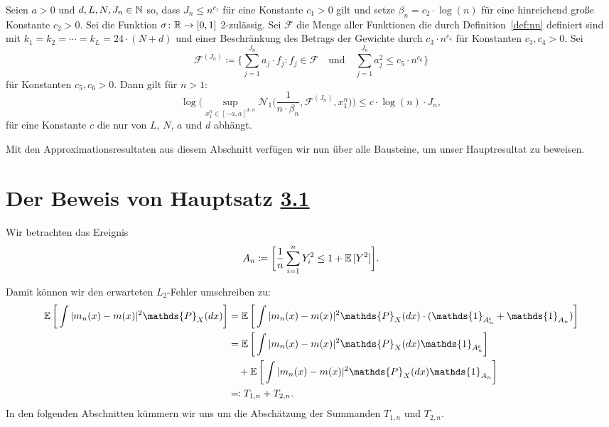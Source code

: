 \begin{lem}
\label{lem:9}
Seien $a > 0$ und $d, L, N, J_n \in \mathbb{N}$ so, dass $J_n \leq n^{c_{1}}$ für eine Konstante $c_1 > 0$ gilt und setze $\beta_n = c_2 \cdot \log(n)$ für eine hinreichend große Konstante $c_2 > 0.$ 
Sei die Funktion $\sigma\colon \mathbb{R} \to [0, 1]$ 2-zulässig. Sei $\mathcal{F}$ die Menge aller Funktionen die durch Definition~\ref{def:nn} definiert sind mit $k_1 = k_2 = \cdots = k_L = 24 \cdot (N + d)$ und einer Beschränkung des Betrags der Gewichte durch $c_{3} \cdot n^{c_{4}}$ für Konstanten $c_3, c_4 > 0$. Sei
$$ \mathcal{F}^{(J_n)} \coloneqq \biggl\{\sum_{j = 1}^{J_n} a_j \cdot f_j : f_j \in \mathcal{F} \quad \text{und} \quad \sum_{j = 1}^{J_n} a_j^2 \leq c_{5} \cdot n^{c_{6}}\biggr\}$$ für Konstanten $c_5, c_6 > 0.$
Dann gilt für $n > 1$:
$$\log\bigg(\sup_{x_1^n\in[-a,a]^{d \cdot n}} \mathcal{N}_1\bigg(\frac{1}{n \cdot \beta_n}, \mathcal{F}^{(J_n)},x_1^n\bigg)\bigg) \leq c \cdot \log(n) \cdot J_n,$$
für eine Konstante $c$ die nur von $L$, $N$, $a$ und $d$ abhängt.
\end{lem}

Mit den Approximationsresultaten aus diesem Abschnitt verfügen wir nun über alle Bausteine, um unser Hauptresultat zu beweisen.

\section{Der Beweis von Hauptsatz \hyperref[optstop]{3.1}}

Wir betrachten das Ereignis 
\begin{equation}
\label{event}
A_n \coloneqq \bigg[\frac{1}{n} \sum_{i = 1}^n Y_i^2 \leq 1 + \mathbb{E}\,[Y^2]\bigg].
\end{equation}

Damit können wir den erwarteten $L_2$-Fehler umschreiben zu:
\begin{equation}
\label{originaleq}
\begin{split}
\E \bigg[\int |m_n(x) - m(x)|^2 \mathds{P}_X(dx)\bigg] & = \E \bigg[\int |m_n(x) - m(x)|^2 \mathds{P}_X(dx) \cdot (\mathds{1}_{A_n^{\mathsf{c}}} + \mathds{1}_{A_n})\bigg] \\
& = \E \bigg[\int |m_n(x) - m(x)|^2 \mathds{P}_X(dx) \mathds{1}_{A_n^{\mathsf{c}}}\bigg] \\
& \quad + \E \bigg[\int |m_n(x) - m(x)|^2 \mathds{P}_X(dx) \mathds{1}_{A_n}\bigg] \\
& \eqqcolon T_{1,n} + T_{2,n}.
\end{split}
\end{equation}
In den folgenden Abschnitten kümmern wir uns um die Abschätzung der Summanden $T_{1,n}$ und $T_{2,n}$.

